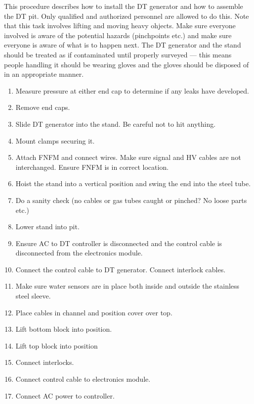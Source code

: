 \documentclass[10pt]{article}
\begin{document}
This procedure describes how to install the DT generator and how to assemble the DT pit. Only qualified and authorized personnel are allowed to do this. Note that this task involves lifting and moving heavy ohjects. Make sure everyone involved is aware of the potential hazards (pinchpoints etc.) and make sure everyone is aware of what is to happen next. The DT generator and the stand should be treated as if contaminated until properly surveyed --- this means people handling it should be wearing gloves and the gloves should be disposed of in an appropriate manner.
\begin{enumerate}
\item \CheckBox[name=dtpap1]{} Measure pressure at either end cap to determine if any leaks have developed.
\item \CheckBox[name=dtpap2]{} Remove end caps.
\item \CheckBox[name=dtpap3]{} Slide DT generator into the stand. Be careful not to hit anything.
\item \CheckBox[name=dtpap4]{} Mount clamps securing it. 
\item \CheckBox[name=dtpap5]{} Attach FNFM and connect wires. Make sure signal and HV cables are not interchanged. Ensure FNFM is in correct location.
\item \CheckBox[name=dtpap6]{} Hoist the stand into a vertical position and swing the end into the steel tube.
\item \CheckBox[name=dtpap7]{} Do a sanity check (no cables or gas tubes caught or pinched? No loose parts etc.)
\item \CheckBox[name=dtpap8]{} Lower stand into pit.
\item \CheckBox[name=dtpap9]{} Ensure AC to DT controller is disconnected and the control cable is disconnected from the electronics module.
\item \CheckBox[name=dtpap10]{} Connect the control cable to DT generator. Connect interlock cables.
\item \CheckBox[name=dtpap11]{} Make sure water sensors are in place both inside and outside the stainless steel sleeve. 
\item \CheckBox[name=dtpap12]{} Place cables in channel and position cover over top.
\item \CheckBox[name=dtpap13]{} Lift bottom block into position.
\item \CheckBox[name=dtpap14]{} Lift top block into position
\item \CheckBox[name=dtpap15]{} Connect interlocks.
\item \CheckBox[name=dtpap16]{} Connect control cable to electronics module.
\item \CheckBox[name=dtpap15]{} Connect AC power to controller.
\end{enumerate}
\end{document}
